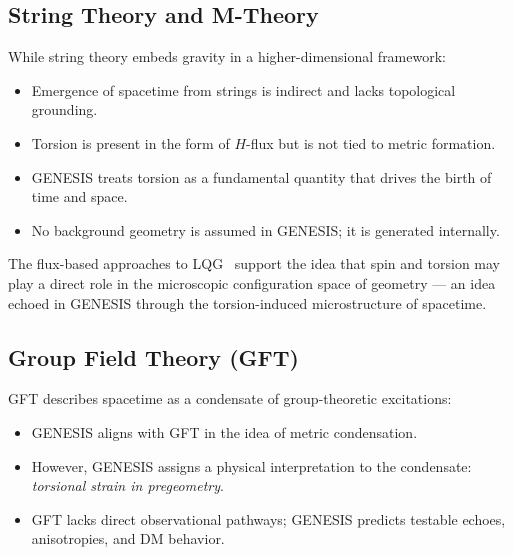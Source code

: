 \documentclass{article}
\begin{document}
\subsection{String Theory and M-Theory} While string theory embeds gravity in a higher-dimensional framework: \begin{itemize} \item Emergence of spacetime from strings is indirect and lacks topological grounding. \item Torsion is present in the form of $H$-flux but is not tied to metric formation. \item GENESIS treats torsion as a fundamental quantity that drives the birth of time and space. \item No background geometry is assumed in GENESIS; it is generated internally. \end{itemize}

The flux-based approaches to LQG~\cite{freidel2011} support the idea that spin and torsion may play a direct role in the microscopic configuration space of geometry — an idea echoed in GENESIS through the torsion-induced microstructure of spacetime.


\medskip
\begin{center}
\end{center}
\medskip


\subsection{Group Field Theory (GFT)} GFT describes spacetime as a condensate of group-theoretic excitations: \begin{itemize} \item GENESIS aligns with GFT in the idea of metric condensation. \item However, GENESIS assigns a physical interpretation to the condensate: \textit{torsional strain in pregeometry}. \item GFT lacks direct observational pathways; GENESIS predicts testable echoes, anisotropies, and DM behavior. \end{itemize}
\end{document}
